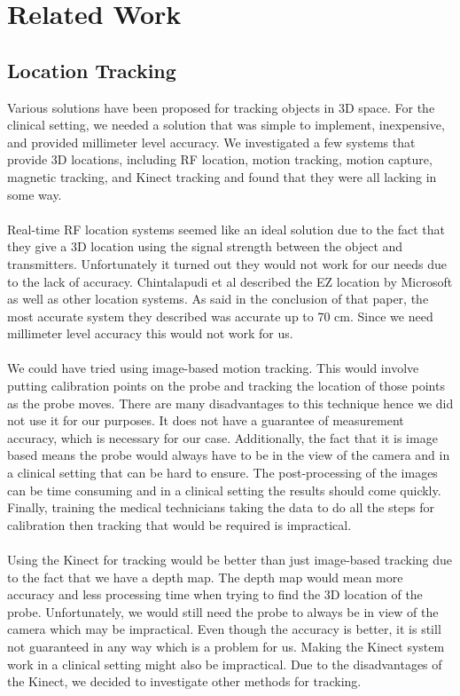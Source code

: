 \documentclass[conference]{acmsiggraph}
\begin{document}
\section{Related Work}

\subsection{Location Tracking}

Various solutions have been proposed for tracking objects in 3D space. For the clinical setting, we needed a solution that was simple to implement, inexpensive, and provided millimeter level accuracy. We investigated a few systems that provide 3D locations, including RF location, motion tracking, motion capture, magnetic tracking, and Kinect tracking and found that they were all lacking in some way. \\
\\
Real-time RF location systems seemed like an ideal solution due to the fact that they give a 3D location using the signal strength between the object and transmitters. Unfortunately it turned out they would not work for our needs due to the lack of accuracy. Chintalapudi et al \cite{ezlocation} described the EZ location by Microsoft as well as other location systems. As said in the conclusion of that paper, the most accurate system they described was accurate up to 70 cm. Since we need millimeter level accuracy this would not work for us. \\
\\
We could have tried using image-based motion tracking. This would involve putting calibration points on the probe and tracking the location of those points as the probe moves. There are many disadvantages to this technique hence we did not use it for our purposes. It does not have a guarantee of measurement accuracy, which is necessary for our case. Additionally, the fact that it is image based means the probe would always have to be in the view of the camera and in a clinical setting that can be hard to ensure. The post-processing of the images can be time consuming and in a clinical setting the results should come quickly. Finally, training the medical technicians taking the data to do all the steps for calibration then tracking that would be required is impractical. \\
\\
Using the Kinect for tracking would be better than just image-based tracking due to the fact that we have a depth map. The depth map would mean more accuracy and less processing time when trying to find the 3D location of the probe. Unfortunately, we would still need the probe to always be in view of the camera which may be impractical. Even though the accuracy is better, it is still not guaranteed in any way which is a problem for us. Making the Kinect system work in a clinical setting might also be impractical. Due to the disadvantages of the Kinect, we decided to investigate other methods for tracking. \\
\end{document}

